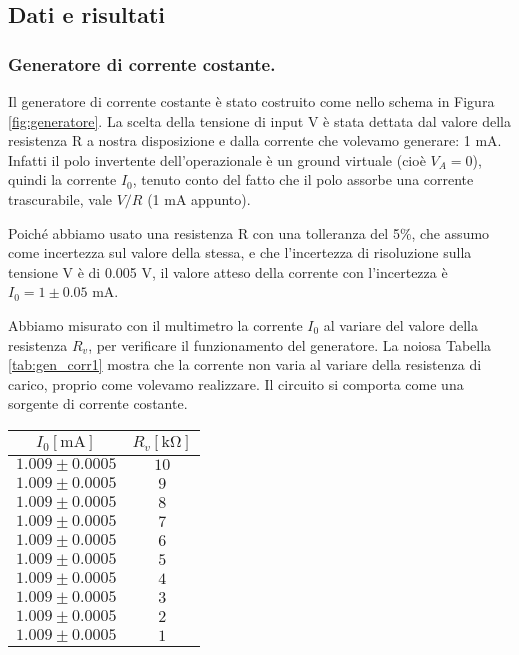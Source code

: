\subsection{Dati e risultati}

\subsubsection{Generatore di corrente costante.}

Il generatore di corrente costante è stato costruito come nello schema in
Figura \ref{fig:generatore}. La scelta della tensione di input V è stata dettata
dal valore della resistenza R a nostra disposizione e dalla corrente che volevamo
generare: 1 mA. Infatti il polo invertente dell'operazionale è un ground virtuale
(cioè $V_A = 0$), quindi la corrente $I_0$, tenuto conto del fatto che il polo
assorbe una corrente trascurabile, vale $V/R$ (1 mA appunto). 

Poiché abbiamo usato una resistenza R con una tolleranza del 5\%,
che assumo come incertezza sul valore della stessa, e che l'incertezza di risoluzione
sulla tensione V è di 0.005 V, il valore atteso della corrente con l'incertezza è
$I_0 = 1 \pm 0.05$ mA.

Abbiamo misurato con il multimetro la corrente $I_0$ al variare del valore della
resistenza $R_v$, per verificare il funzionamento del generatore. La noiosa
Tabella \ref{tab:gen_corr1} mostra che la corrente non varia al variare della resistenza
di carico, proprio come volevamo realizzare. Il circuito si comporta come
una sorgente di corrente costante.

\begin{SCtable}[1][h]
    \centering
    \begin{tabular}{c c}
        \toprule
            $I_0 [\si{\milli\ampere}]$ & $R_v [\si{\kilo\ohm}]$ \\
        \midrule
            $ 1.009 \pm 0.0005 $ & $ 10 $ \\
            $ 1.009 \pm 0.0005 $ & $ 9 $ \\
            $ 1.009 \pm 0.0005 $ & $ 8 $ \\
            $ 1.009 \pm 0.0005 $ & $ 7 $ \\
            $ 1.009 \pm 0.0005 $ & $ 6 $ \\
            $ 1.009 \pm 0.0005 $ & $ 5 $ \\
            $ 1.009 \pm 0.0005 $ & $ 4 $ \\
            $ 1.009 \pm 0.0005 $ & $ 3 $ \\
            $ 1.009 \pm 0.0005 $ & $ 2 $ \\
            $ 1.009 \pm 0.0005 $ & $ 1 $ \\
        \bottomrule
    \end{tabular}
    \caption{La corrente nel circuito \ref{fig:generatore} rimane costante
        al variare della resistenza di carico $R_v$. Le incertezze riportare sul
        valore di corrente sono incertezze di risoluzione del multimetro
        (metà della risoluzione), mentre sui valori di resistenza non sono riportate
        perchè non rilevanti (sono comunque dell'ordine di qualche ohm).}
    \label{tab:gen_corr1}
\end{SCtable}

